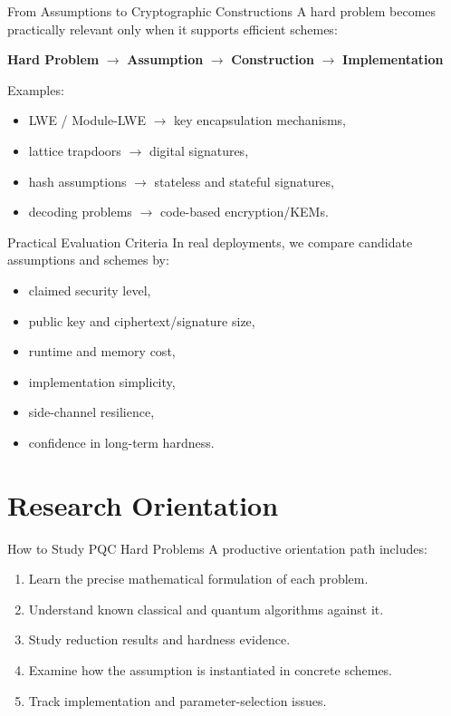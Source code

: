 \documentclass[aspectratio=169]{beamer}
\begin{document}
	\begin{frame}{From Assumptions to Cryptographic Constructions}
		A hard problem becomes practically relevant only when it supports efficient schemes:
		\begin{center}
			\textbf{Hard Problem} $\longrightarrow$ \textbf{Assumption} $\longrightarrow$ \textbf{Construction} $\longrightarrow$ \textbf{Implementation}
		\end{center}
		
		\vspace{0.75em}
		Examples:
		\begin{itemize}
			\item LWE / Module-LWE $\rightarrow$ key encapsulation mechanisms,
			\item lattice trapdoors $\rightarrow$ digital signatures,
			\item hash assumptions $\rightarrow$ stateless and stateful signatures,
			\item decoding problems $\rightarrow$ code-based encryption/KEMs.
		\end{itemize}
	\end{frame}
	
	\begin{frame}{Practical Evaluation Criteria}
		In real deployments, we compare candidate assumptions and schemes by:
		\begin{itemize}
			\item claimed security level,
			\item public key and ciphertext/signature size,
			\item runtime and memory cost,
			\item implementation simplicity,
			\item side-channel resilience,
			\item confidence in long-term hardness.
		\end{itemize}
	\end{frame}
	
	\section{Research Orientation}
	
	\begin{frame}{How to Study PQC Hard Problems}
		A productive orientation path includes:
		\begin{enumerate}
			\item Learn the precise mathematical formulation of each problem.
			\item Understand known classical and quantum algorithms against it.
			\item Study reduction results and hardness evidence.
			\item Examine how the assumption is instantiated in concrete schemes.
			\item Track implementation and parameter-selection issues.
		\end{enumerate}
	\end{frame}
	
\end{document}
